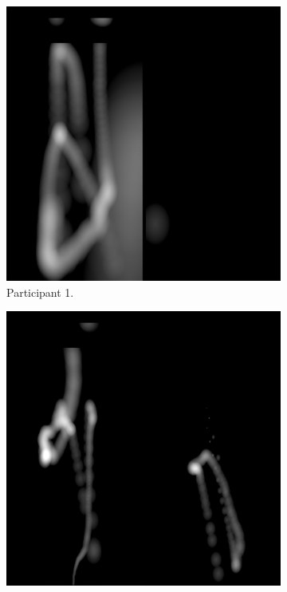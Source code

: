 \newpage{}

\begin{figure}[!ht]\centering
    \begin{subfigure}[b]{0.24\textwidth}
        \centering
        \includegraphics[width=\textwidth]{img/data/Panel11/single/1.png}
        \caption{Participant 1.}
    \end{subfigure}
    \hfill
    \begin{subfigure}[b]{0.24\textwidth}
        \centering
        \includegraphics[width=\textwidth]{img/data/Panel11/single/2.png}

\end{subfigure}
\end{figure}
